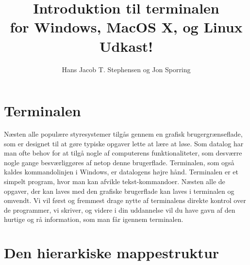 \documentclass[a4paper]{article}
\title{Introduktion til terminalen\\ for Windows, MacOS X, og Linux\\Udkast!}
\author{Hans Jacob T. Stephensen og Jon Sporring }
\begin{document}
\maketitle

\section{Terminalen}

Næsten alle populære styresystemer tilgås gennem en grafisk brugergrænseflade, som er designet til at gøre typiske opgaver lette at lære at løse. Som datalog har man ofte behov for at tilgå nogle af computerens funktionaliteter, som desværre nogle gange besværliggøres af netop denne brugerflade. Terminalen, som også kaldes kommandolinjen i Windows, er datalogens højre hånd. Terminalen er et simpelt program, hvor man kan afvikle tekst-kommandoer. Næsten alle de opgaver, der kan laves med den grafiske brugerflade kan laves i terminalen og omvendt. Vi vil først og fremmest drage nytte af terminalens direkte kontrol over de programmer, vi skriver, og videre i din uddannelse vil du have gavn af den hurtige og rå information, som man får igennem terminalen.

\section{Den hierarkiske mappestruktur}
\end{document}
